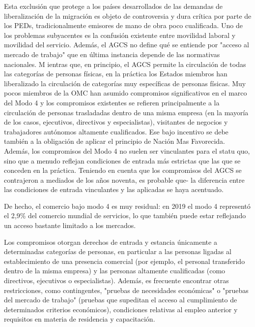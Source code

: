 \documentclass[10pt,a4paper]{article}
\begin{document}
Esta exclusión que protege a los países desarrollados de las demandas de liberalización de la migración es objeto de controversia y dura crítica por parte de los PEDs, tradicionalmente emisores de mano de obra poco cualificada. Uno de los problemas subyacentes es la confusión existente entre movilidad laboral y movilidad del servicio. Además, el AGCS no define qué se entiende por "acceso al mercado de trabajo" que en última instancia depende de las normativas nacionales. M ientras que, en principio, el AGCS permite la circulación de todas las categorías de personas físicas, en la práctica los Estados miembros han liberalizado la circulación de categorías muy específicas de personas físicas. Muy pocos miembros de la OMC han asumido compromisos significativos en el marco del Modo 4 y los compromisos existentes se refieren principalmente a la circulación de personas trasladadas dentro de una misma empresa (en la mayoría de los casos, ejecutivos, directivos y especialistas), visitantes de negocios y trabajadores autónomos altamente cualificados. Ese bajo incentivo se debe también a la obligación de aplicar el principio de Nación Mas Favorecida. Además, los compromisos del Modo 4 no suelen ser vinculantes para el statu quo, sino que a menudo reflejan condiciones de entrada más estrictas que las que se conceden en la práctica. Teniendo en cuenta que los compromisos del AGCS se contrajeron a mediados de los años noventa, es probable que- la diferencia entre las condiciones de entrada vinculantes y las aplicadas se haya acentuado.

De hecho, el comercio bajo modo 4 es muy residual: en 2019 el modo 4 representó el 2,9\% del comercio mundial de servicios, lo que también puede estar reflejando un acceso bastante limitado a los mercados.

Los compromisos otorgan derechos de entrada y estancia únicamente a determinadas categorías de personas, en particular a las personas ligadas al establecimiento de una presencia comercial (por ejemplo, el personal transferido dentro de la misma empresa) y las personas altamente cualificadas (como directivos, ejecutivos o especialistas). Además, es frecuente encontrar otras restricciones, como contingentes, "pruebas de necesidades económicas" o "pruebas del mercado de trabajo" (pruebas que supeditan el acceso al cumplimiento de determinados criterios económicos), condiciones relativas al empleo anterior y requisitos en materia de residencia y capacitación.
\end{document}
